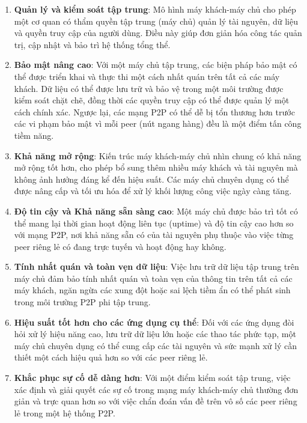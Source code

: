\begin{enumerate}
    \item \textbf{Quản lý và kiểm soát tập trung}:  
    Mô hình máy khách-máy chủ cho phép một cơ quan có thẩm quyền tập trung (máy chủ) quản lý tài nguyên, dữ liệu và quyền truy cập của người dùng. Điều này giúp đơn giản hóa công tác quản trị, cập nhật và bảo trì hệ thống tổng thể.
    
    \item \textbf{Bảo mật nâng cao}:  
    Với một máy chủ tập trung, các biện pháp bảo mật có thể được triển khai và thực thi một cách nhất quán trên tất cả các máy khách. Dữ liệu có thể được lưu trữ và bảo vệ trong một môi trường được kiểm soát chặt chẽ, đồng thời các quyền truy cập có thể được quản lý một cách chính xác. Ngược lại, các mạng P2P có thể dễ bị tổn thương hơn trước các vi phạm bảo mật vì mỗi peer (nút ngang hàng) đều là một điểm tấn công tiềm năng.
    
    \item \textbf{Khả năng mở rộng}:  
    Kiến trúc máy khách-máy chủ nhìn chung có khả năng mở rộng tốt hơn, cho phép bổ sung thêm nhiều máy khách và tài nguyên mà không ảnh hưởng đáng kể đến hiệu suất. Các máy chủ chuyên dụng có thể được nâng cấp và tối ưu hóa để xử lý khối lượng công việc ngày càng tăng.
    
    \item \textbf{Độ tin cậy và Khả năng sẵn sàng cao}:  
    Một máy chủ được bảo trì tốt có thể mang lại thời gian hoạt động liên tục (uptime) và độ tin cậy cao hơn so với mạng P2P, nơi khả năng sẵn có của tài nguyên phụ thuộc vào việc từng peer riêng lẻ có đang trực tuyến và hoạt động hay không.
    
    \item \textbf{Tính nhất quán và toàn vẹn dữ liệu}:  
    Việc lưu trữ dữ liệu tập trung trên máy chủ đảm bảo tính nhất quán và toàn vẹn của thông tin trên tất cả các máy khách, ngăn ngừa các xung đột hoặc sai lệch tiềm ẩn có thể phát sinh trong môi trường P2P phi tập trung.
    
    \item \textbf{Hiệu suất tốt hơn cho các ứng dụng cụ thể}:  
    Đối với các ứng dụng đòi hỏi xử lý hiệu năng cao, lưu trữ dữ liệu lớn hoặc các thao tác phức tạp, một máy chủ chuyên dụng có thể cung cấp các tài nguyên và sức mạnh xử lý cần thiết một cách hiệu quả hơn so với các peer riêng lẻ.
    
    \item \textbf{Khắc phục sự cố dễ dàng hơn}:  
    Với một điểm kiểm soát tập trung, việc xác định và giải quyết các sự cố trong mạng máy khách-máy chủ thường đơn giản và trực quan hơn so với việc chẩn đoán vấn đề trên vô số các peer riêng lẻ trong một hệ thống P2P.
\end{enumerate}

